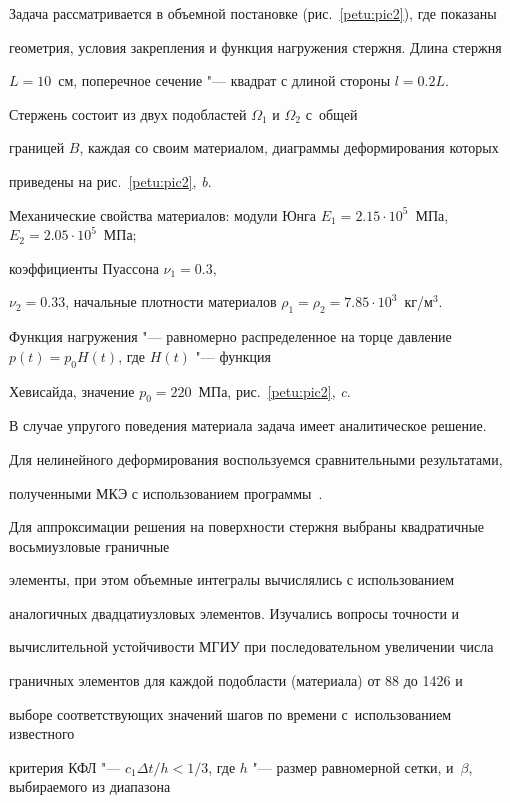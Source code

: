 Задача рассматривается в объемной постановке (рис.~\ref{petu:pic2}), где показаны

геометрия, условия закрепления и функция нагружения стержня. Длина стержня

$L = 10$~см, поперечное сечение "--- квадрат с длиной стороны $l= 0.2L$.

Стержень состоит из двух подобластей $\Omega _1$ и $\Omega _2$ с~общей

границей $B$, каждая со своим материалом, диаграммы деформирования которых

приведены на рис.~\ref{petu:pic2}, {\sl b}.



Механические свойства материалов: модули Юнга $E_1 = 2.15 \cdot

10^5$~МПа, $E_2 =2.05 \cdot 10^5$~МПа; 

коэффициенты Пуассона $\nu_1 = 0.3$, 

$\nu _2 =0.33$, начальные плотности материалов $\rho _1 =\rho _2

= 7.85 \cdot 10^{3}$~кг/м$^3$. 

Функция нагружения "--- равномерно распределенное на торце давление $p(t)=p_0 H(t)$, где $H(t)$ "--- функция

Хевисайда, значение $p_0= 220$~МПа, рис.~\ref{petu:pic2}, {\sl c}.



В случае упругого поведения материала задача имеет аналитическое решение.

Для нелинейного деформирования воспользуемся сравнительными результатами,

полученными МКЭ с использованием программы~\cite{petu:bib22}. 

Для аппроксимации решения на поверхности стержня выбраны квадратичные восьмиузловые граничные

элементы, при этом объемные интегралы вычислялись с использованием

аналогичных двадцатиузловых элементов. Изучались вопросы точности и

вычислительной устойчивости МГИУ при последовательном увеличении числа

граничных элементов для каждой подобласти (материала) от 88 до 1426 и

выборе соответствующих значений шагов по времени с~использованием известного

критерия КФЛ "--- $c_1 \Delta t/h<1/3$, где $h$ "--- размер равномерной сетки, и~$\beta$, выбираемого из диапазона

